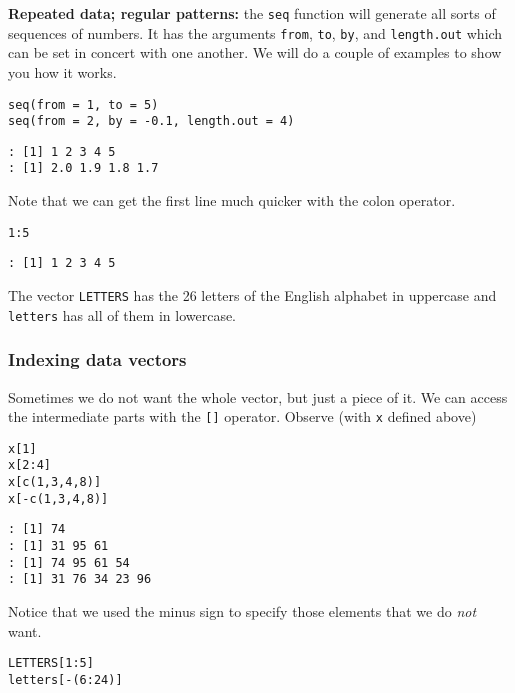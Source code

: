 \textbf{Repeated data; regular patterns:} the \texttt{seq} 
function will generate all sorts of sequences of numbers. It has the
arguments \texttt{from}, \texttt{to}, \texttt{by}, and \texttt{length.out} which can be set in
concert with one another. We will do a couple of examples to show you
how it works.

\begin{verbatim}
seq(from = 1, to = 5)
seq(from = 2, by = -0.1, length.out = 4)
\end{verbatim}

\begin{verbatim}
: [1] 1 2 3 4 5
: [1] 2.0 1.9 1.8 1.7
\end{verbatim}

Note that we can get the first line much quicker with the colon
operator.

\begin{verbatim}
1:5
\end{verbatim}

\begin{verbatim}
: [1] 1 2 3 4 5
\end{verbatim}

The vector \texttt{LETTERS}  has the 26
letters of the English alphabet in uppercase and
\texttt{letters}  has all of them in
lowercase.

\subsubsection{Indexing data vectors}
\label{sec-2-3-3-2}

Sometimes we do not want the whole vector, but just a piece of it. We
can access the intermediate parts with the \texttt{[]} operator. Observe
(with \texttt{x} defined above)

\begin{verbatim}
x[1]
x[2:4]
x[c(1,3,4,8)]
x[-c(1,3,4,8)]
\end{verbatim}

\begin{verbatim}
: [1] 74
: [1] 31 95 61
: [1] 74 95 61 54
: [1] 31 76 34 23 96
\end{verbatim}

Notice that we used the minus sign to specify those elements that we
do \emph{not} want.

\begin{verbatim}
LETTERS[1:5]
letters[-(6:24)]
\end{verbatim}

